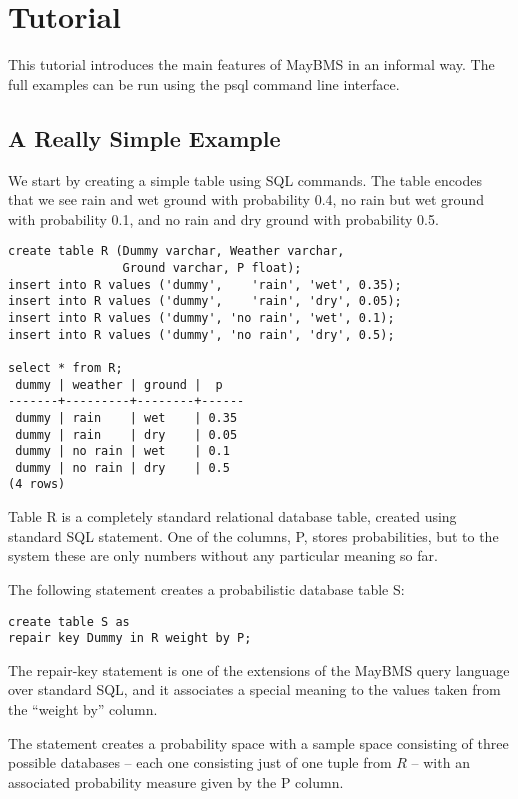 \chapter{Tutorial}


This tutorial introduces the main features of MayBMS in an informal
way. The full examples can be run using the psql command line interface.



\section{A Really Simple Example}


We start by creating a simple table using SQL commands.
The table encodes that we see rain and wet ground with probability 0.4,
no rain but wet ground with probability 0.1, and
no rain and dry ground with probability 0.5.
%
\begin{verbatim}
create table R (Dummy varchar, Weather varchar,
                Ground varchar, P float);
insert into R values ('dummy',    'rain', 'wet', 0.35);
insert into R values ('dummy',    'rain', 'dry', 0.05);
insert into R values ('dummy', 'no rain', 'wet', 0.1);
insert into R values ('dummy', 'no rain', 'dry', 0.5);

select * from R;
 dummy | weather | ground |  p
-------+---------+--------+------
 dummy | rain    | wet    | 0.35
 dummy | rain    | dry    | 0.05
 dummy | no rain | wet    | 0.1
 dummy | no rain | dry    | 0.5
(4 rows)
\end{verbatim}

Table R is a completely standard relational database table,
created using standard SQL statement. One of the columns, P, stores
probabilities, but to the system these are only numbers without any particular
meaning so far.

The following statement creates a probabilistic database table S:
%
\begin{verbatim}
create table S as
repair key Dummy in R weight by P;
\end{verbatim}

The repair-key statement is one of the extensions of the MayBMS query
language over standard SQL, and it associates a special meaning to the
values taken from the ``weight by'' column.

The statement creates a probability space with a sample space consisting 
of three possible databases -- each one consisting just of one tuple
from $R$ -- with an associated probability measure given by the P column.

